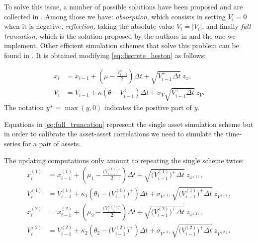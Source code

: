 To solve this issue, a number of possible solutions have been proposed and are collected in \citep{LORD2010}. Among those we have:
\textit{absorption}, which consists in setting $V_i = 0$ when it is negative, \textit{reflection}, taking the absolute value $V_i = |V_i|$, and finally \textit{full truncation}, which is the solution proposed  by the authors in \citep{LORD2010} and the one we  implement. Other efficient simulation schemes that solve this problem can be found in \citep{andersen}. It is obtained modifying \eqref{eq:discrete_heston} as follows:

\begin{subequations}
	\label{eq:full_truncation}
	\begin{align}
	x_i &= x_{i-1} + (\mu -  \frac{V_{i-1}^+}{2})\Delta t + \sqrt{V_{i-1}^+ \Delta t} \:z_x, \\
	V_i &= V_{i-1} + \kappa(\theta - V_{i-1}^+ )\Delta t + \sigma_V \sqrt{V_{i-1}^+ \Delta t} \: z_V.
	\end{align}
\end{subequations}
The notation $y^+ = \max(y, 0)$ indicates the positive part of $y$. 

Equations in \eqref{eq:full_truncation} represent the single asset simulation scheme but in order to calibrate the asset-asset correlations we need to simulate the time-series for a pair of assets.

The updating computations only amount to repeating the single scheme twice:
\begin{subequations}
	\label{eq:full_truncation2}
	\begin{align}
	x_i^{(1)} &= x_{i-1}^{(1)} + (\mu_1 -  \frac{\Big(V_{i-1}^{(1)}\Big)^+}{2})\Delta t + \sqrt{\Big(V_{i-1}^{(1)}\Big)^+ \Delta t} \:z_{x^{(1)}}, \\
	V_i^{(1)} &= V_{i-1}^{(1)} + \kappa_1(\theta_1 - \Big(V_{i-1}^{(1)}\Big)^+ )\Delta t + \sigma_{V^{(1)}} \sqrt{\Big(V_{i-1}^{(1)}\Big)^+ \Delta t} \: z_{V^(1)},\\
	x_i^{(2)} &= x_{i-1}^{(2)} + (\mu_2 -  \frac{\Big(V_{i-1}^{(2)}\Big)^+}{2})\Delta t + \sqrt{\Big(V_{i-1}^{(2)}\Big)^+\Delta t} \:z_{x^{(2)}}, \\
	V_i^{(2)} &= V_{i-1}^{(2)} + \kappa_2(\theta_2 - \Big(V_{i-1}^{(2)}\Big)^+ )\Delta t + \sigma_{V^{(2)}} \sqrt{\Big(V_{i-1}^{(2)}\Big)^+ \Delta t} \: z_{V^{(2)}}.
	\end{align}
\end{subequations}

